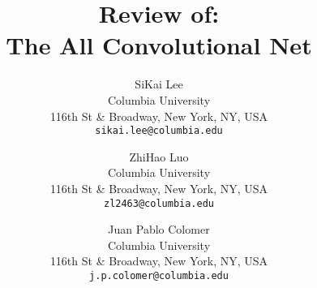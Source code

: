 \documentclass[10pt,twocolumn,letterpaper]{article}
\begin{document}

\title{Review of:\\
The All Convolutional Net}


\author{
SiKai Lee\\
Columbia University\\
116th St \& Broadway, New York, NY, USA\\
{\tt\small sikai.lee@columbia.edu}
\and
ZhiHao Luo\\
Columbia University\\
116th St \& Broadway, New York, NY, USA\\
{\tt\small zl2463@columbia.edu}
\and
Juan Pablo Colomer\\
Columbia University\\
116th St \& Broadway, New York, NY, USA\\
{\tt\small j.p.colomer@columbia.edu}
}
\maketitle







{\small


}
\end{document}
